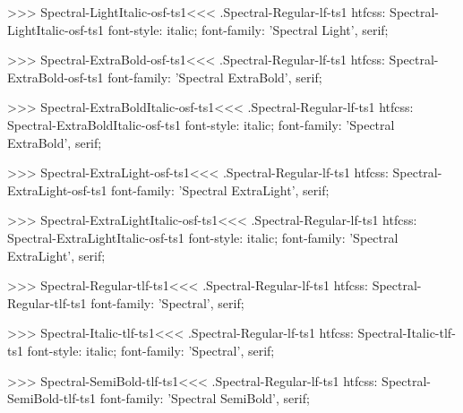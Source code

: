 >>>
\<Spectral-LightItalic-osf-ts1\><<<
.Spectral-Regular-lf-ts1
htfcss:  Spectral-LightItalic-osf-ts1  font-style: italic; font-family: 'Spectral Light', serif;

>>>
\<Spectral-ExtraBold-osf-ts1\><<<
.Spectral-Regular-lf-ts1
htfcss:  Spectral-ExtraBold-osf-ts1  font-family: 'Spectral ExtraBold', serif;

>>>
\<Spectral-ExtraBoldItalic-osf-ts1\><<<
.Spectral-Regular-lf-ts1
htfcss:  Spectral-ExtraBoldItalic-osf-ts1  font-style: italic; font-family: 'Spectral ExtraBold', serif;

>>>
\<Spectral-ExtraLight-osf-ts1\><<<
.Spectral-Regular-lf-ts1
htfcss:  Spectral-ExtraLight-osf-ts1  font-family: 'Spectral ExtraLight', serif;

>>>
\<Spectral-ExtraLightItalic-osf-ts1\><<<
.Spectral-Regular-lf-ts1
htfcss:  Spectral-ExtraLightItalic-osf-ts1  font-style: italic; font-family: 'Spectral ExtraLight', serif;

>>>
\<Spectral-Regular-tlf-ts1\><<<
.Spectral-Regular-lf-ts1
htfcss:  Spectral-Regular-tlf-ts1  font-family: 'Spectral', serif;

>>>
\<Spectral-Italic-tlf-ts1\><<<
.Spectral-Regular-lf-ts1
htfcss:  Spectral-Italic-tlf-ts1  font-style: italic; font-family: 'Spectral', serif;

>>>
\<Spectral-SemiBold-tlf-ts1\><<<
.Spectral-Regular-lf-ts1
htfcss:  Spectral-SemiBold-tlf-ts1  font-family: 'Spectral SemiBold', serif;

